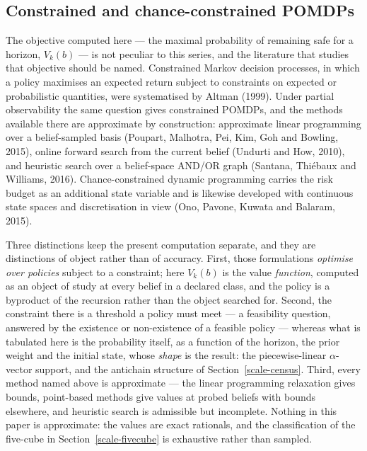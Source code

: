 \documentclass[10pt,twocolumn]{article}
\theoremstyle{plain}
\theoremstyle{definition}
\theoremstyle{remark}
\begin{document}
\subsection{Constrained and chance-constrained POMDPs}
\label{scale-cpomdp}

The objective computed here --- the maximal probability of remaining safe for a horizon,
\(V_k(b)\) --- is not peculiar to this series, and the literature that studies that
objective should be named. Constrained Markov decision processes, in which a policy
maximises an expected return subject to constraints on expected or probabilistic
quantities, were systematised by Altman (1999). Under partial observability the same
question gives constrained POMDPs, and the methods available there are approximate by
construction: approximate linear programming over a belief-sampled basis (Poupart,
Malhotra, Pei, Kim, Goh and Bowling, 2015), online forward search from the current belief
(Undurti and How, 2010), and heuristic search over a belief-space AND/OR graph (Santana,
Thi\'ebaux and Williams, 2016). Chance-constrained dynamic programming carries the risk
budget as an additional state variable and is likewise developed with continuous state
spaces and discretisation in view (Ono, Pavone, Kuwata and Balaram, 2015).

Three distinctions keep the present computation separate, and they are distinctions of
object rather than of accuracy. First, those formulations \emph{optimise over policies}
subject to a constraint; here \(V_k(b)\) is the value \emph{function}, computed as an
object of study at every belief in a declared class, and the policy is a byproduct of the
recursion rather than the object searched for. Second, the constraint there is a threshold
a policy must meet --- a feasibility question, answered by the existence or non-existence
of a feasible policy --- whereas what is tabulated here is the probability itself, as a
function of the horizon, the prior weight and the initial state, whose \emph{shape} is the
result: the piecewise-linear \(\alpha\)-vector support, and the antichain structure of
Section~\ref{scale-census}. Third, every method named above is approximate --- the linear
programming relaxation gives bounds, point-based methods give values at probed beliefs
with bounds elsewhere, and heuristic search is admissible but incomplete. Nothing in this
paper is approximate: the values are exact rationals, and the classification of the
five-cube in Section~\ref{scale-fivecube} is exhaustive rather than sampled.
\end{document}
